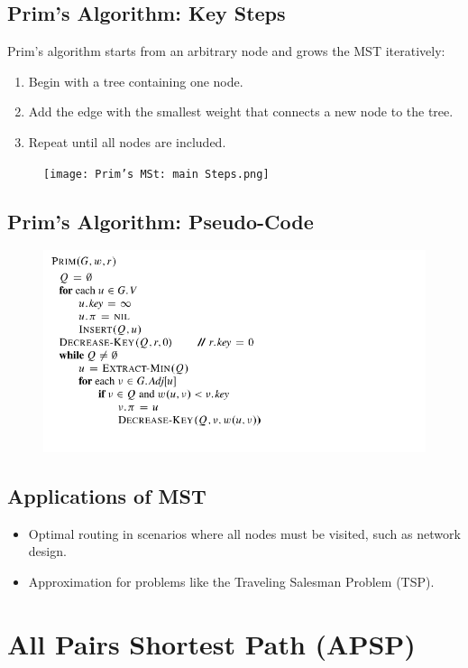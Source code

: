 \subsection{Prim's Algorithm: Key Steps}
Prim's algorithm starts from an arbitrary node and grows the MST iteratively:
\begin{enumerate}
    \item Begin with a tree containing one node.
    \item Add the edge with the smallest weight that connects a new node to the tree.
    \item Repeat until all nodes are included.
\end{enumerate}
\begin{figure}[H]
    \centering
    \texttt{[image: Prim's MSt: main Steps.png]}
    \caption{}
    \label{fig:enter-label}
\end{figure}

\subsection{Prim's Algorithm: Pseudo-Code}
 \begin{figure}[H]
     \centering
     \includegraphics[width=0.75\linewidth]{Prim's MSt pseudo.png}
     \label{fig:enter-label}
 \end{figure}


\subsection{Applications of MST}
\begin{itemize}
    \item Optimal routing in scenarios where all nodes must be visited, such as network design.
    \item Approximation for problems like the Traveling Salesman Problem (TSP).
\end{itemize}
\section{All Pairs Shortest Path (APSP)}

